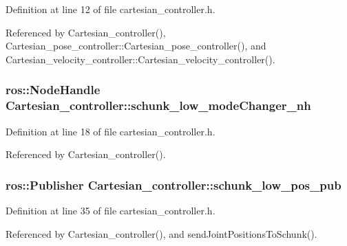 Definition at line 12 of file cartesian\-\_\-controller.\-h.



Referenced by Cartesian\-\_\-controller(), Cartesian\-\_\-pose\-\_\-controller\-::\-Cartesian\-\_\-pose\-\_\-controller(), and Cartesian\-\_\-velocity\-\_\-controller\-::\-Cartesian\-\_\-velocity\-\_\-controller().

\hypertarget{classCartesian__controller_ad90134b232217e84cb58137a9d2030bb}{
\subsubsection[{schunk\-\_\-low\-\_\-mode\-Changer\-\_\-nh}]{\setlength{\rightskip}{0pt plus 5cm}ros\-::\-Node\-Handle Cartesian\-\_\-controller\-::schunk\-\_\-low\-\_\-mode\-Changer\-\_\-nh\hspace{0.3cm}{\ttfamily [protected]}}}\label{classCartesian__controller_ad90134b232217e84cb58137a9d2030bb}


Definition at line 18 of file cartesian\-\_\-controller.\-h.



Referenced by Cartesian\-\_\-controller().

\hypertarget{classCartesian__controller_af06313084ef058d1f979fddeb33d5100}{
\subsubsection[{schunk\-\_\-low\-\_\-pos\-\_\-pub}]{\setlength{\rightskip}{0pt plus 5cm}ros\-::\-Publisher Cartesian\-\_\-controller\-::schunk\-\_\-low\-\_\-pos\-\_\-pub\hspace{0.3cm}{\ttfamily [protected]}}}\label{classCartesian__controller_af06313084ef058d1f979fddeb33d5100}


Definition at line 35 of file cartesian\-\_\-controller.\-h.



Referenced by Cartesian\-\_\-controller(), and send\-Joint\-Positions\-To\-Schunk().

